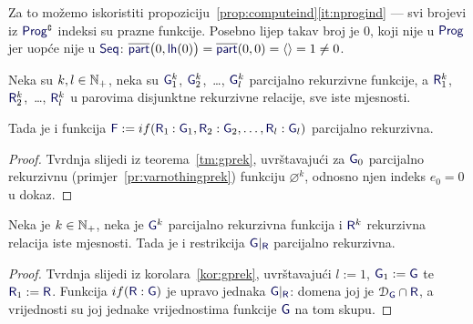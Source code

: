 Za to možemo iskoristiti propoziciju~\ref{prop:computeind}\eqref{it:nprogind} --- svi brojevi iz $\f{Prog}\kompl$ indeksi su prazne funkcije. Posebno lijep takav broj je $0$, koji nije u $\f{Prog}$ jer uopće nije u $\f{Seq}$: $\overline{\f{part}}\bigl(0,\f{lh}(0)\bigr)=\overline{\f{part}}(0,0)=\langle\rangle=1\ne0$.

\begin{korolar}[{name=[{teorem o grananju, parcijalno rekurzivna verzija, bez "inače"}]}]\label{kor:gprek}
Neka su $k,l\in{\mathbb N}_+$, neka su $\f G_1^k$, $\f G_2^k$,~\ldots, $\f G_l^k$ parcijalno rekurzivne funkcije, a $\f R_1^k$, $\f R_2^k$,~\ldots, $\f R_l^k$ u parovima disjunktne rekurzivne relacije, sve iste mjesnosti.

	Tada je i funkcija $\f F:=\IF{\f R_1\mspace{-1mu}:\f G_1,\f R_2:\f G_2,\dots,\f R_l:\f G_l}$ parcijalno rekurzivna.
\end{korolar}
\begin{proof}
	Tvrdnja slijedi iz teorema~\ref{tm:gprek}, uvrštavajući za $\f G_0$ parcijalno rekurzivnu (primjer~\ref{pr:varnothingprek}) funkciju $\varnothing^k$, odnosno njen indeks $e_0=0$ u dokaz.
\end{proof}

\begin{korolar}[{name=[restrikcija na rekurzivan skup čuva parcijalnu rekurzivnost]}]\label{kor:restrprek}
Neka je $k\in{\mathbb N}_+$, neka je $\f G^k$ parcijalno rekurzivna funkcija i $\f R^k$ rekurzivna relacija iste mjesnosti. Tada je i restrikcija $\f G|_{\f R}$ parcijalno rekurzivna.
\end{korolar}
\begin{proof}
Tvrdnja slijedi iz korolara~\ref{kor:gprek}, uvrštavajući $l:=1$, $\f G_1:=\f G$ te $\f R_1:=\f R$. Funkcija $\IF{\f R:\f G}$ je upravo jednaka $\f G|_{\f R}$: domena joj je $\dom{\f G}\cap\f R$, a vrijednosti su joj jednake vrijednostima funkcije $\f G$ na tom skupu.
\end{proof}

